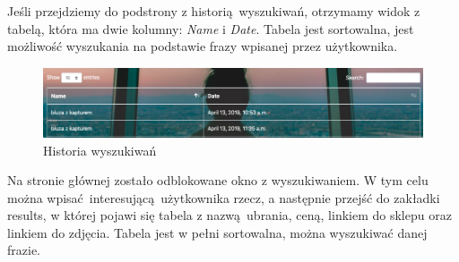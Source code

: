 Jeśli przejdziemy do podstrony z historią wyszukiwań, otrzymamy widok z tabelą, która ma dwie kolumny: \emph{Name} i \emph{Date}.\newline
Tabela jest sortowalna, jest możliwość wyszukania na podstawie frazy wpisanej przez użytkownika.
\begin{figure}[h]
    \includegraphics[width=1.10\textwidth]{history}
    \caption{Historia wyszukiwań}
\end{figure}
\newpage
Na stronie głównej zostało odblokowane okno z wyszukiwaniem. W tym celu można wpisać interesującą użytkownika rzecz, a następnie przejść do zakładki results, w której pojawi się tabela z nazwą ubrania, ceną, linkiem do sklepu oraz linkiem do zdjęcia. Tabela jest w pełni sortowalna, można wyszukiwać danej frazie.

